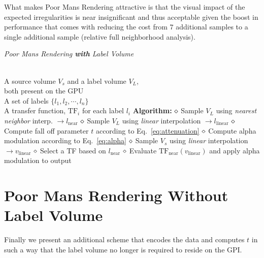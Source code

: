 \documentclass{egpubl}
\begin{document}
What makes Poor Mans Rendering attractive is that the visual impact of the expected irregularities is near insignificant and thus acceptable given the boost in performance that comes with reducing the cost from $7$ additional samples to a single additional sample (relative full neighborhood analysis).

\begin{algorithm}[t]
\caption{\label{code:recon} \emph{Poor Mans Rendering \textbf{with} Label Volume}}
\begin{algorithmic}
\REQUIRE \quad\\
A source volume $V_s$ and a label volume $V_L$,\\both present on the GPU\\
A set of labels $\{ l_1, l_2, \cdots, l_n \}$ \\
A transfer function, $\mathrm{TF}_i$ for each label $l_i$ 
\STATE \hspace{-3mm}\textbf{Algorithm:}
 \nonumber
\STATE $\diamond$ Sample $V_L$ using \emph{nearest neighbor} interp. $\rightarrow l_\mathrm{near}$
\STATE $\diamond$ Sample $V_L$ using \emph{linear} interpolation $\rightarrow l_\mathrm{linear}$
\STATE $\diamond$ Compute fall off parameter $t$ according to Eq.~\ref{eq:attenuation}
\STATE $\diamond$ Compute alpha modulation according to Eq.~\ref{eq:alpha}
\STATE $\diamond$ Sample $V_s$ using \emph{linear} interpolation $\rightarrow v_\mathrm{linear}$ 
\STATE $\diamond$ Select a TF based on $l_\mathrm{near}$
\STATE $\diamond$ Evaluate $\mathrm{TF}_\mathrm{near}(v_\mathrm{linear})$ and apply alpha modulation to output
\ENDFOR
\end{algorithmic}
\end{algorithm}



\section{Poor Mans Rendering Without Label Volume}

Finally we present an additional scheme that encodes the data and computes $t$ in such a way that the label volume no longer is required to reside on the GPI.
\end{document}
